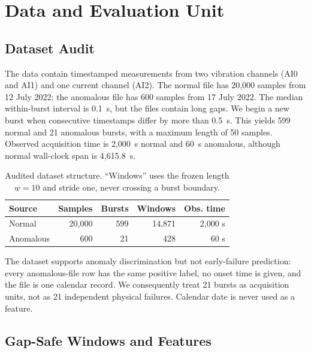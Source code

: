 \documentclass{article}
\begin{document}
\section{Data and Evaluation Unit}

\subsection{Dataset Audit}

The data contain timestamped measurements from two vibration channels (AI0 and AI1) and one current channel (AI2). The normal file has 20,000 samples from 12 July 2022; the anomalous file has 600 samples from 17 July 2022. The median within-burst interval is 0.1~s, but the files contain long gaps. We begin a new burst when consecutive timestamps differ by more than 0.5~s. This yields 599 normal and 21 anomalous bursts, with a maximum length of 50 samples. Observed acquisition time is 2,000~s normal and 60~s anomalous, although normal wall-clock span is 4,615.8~s.

\begin{table}[t]
\caption{Audited dataset structure. ``Windows'' uses the frozen length $w=10$ and stride one, never crossing a burst boundary.}
\label{tab:data}
\centering
\small
\setlength{\tabcolsep}{3.5pt}
\begin{tabular}{lrrrr}
\toprule
Source & Samples & Bursts & Windows & Obs. time \\
\midrule
Normal & 20,000 & 599 & 14,871 & 2,000 s \\
Anomalous & 600 & 21 & 428 & 60 s \\
\bottomrule
\end{tabular}
\end{table}

The dataset supports anomaly discrimination but not early-failure prediction: every anomalous-file row has the same positive label, no onset time is given, and the file is one calendar record. We consequently treat 21 bursts as acquisition units, not as 21 independent physical failures. Calendar date is never used as a feature.

\subsection{Gap-Safe Windows and Features}
\end{document}
